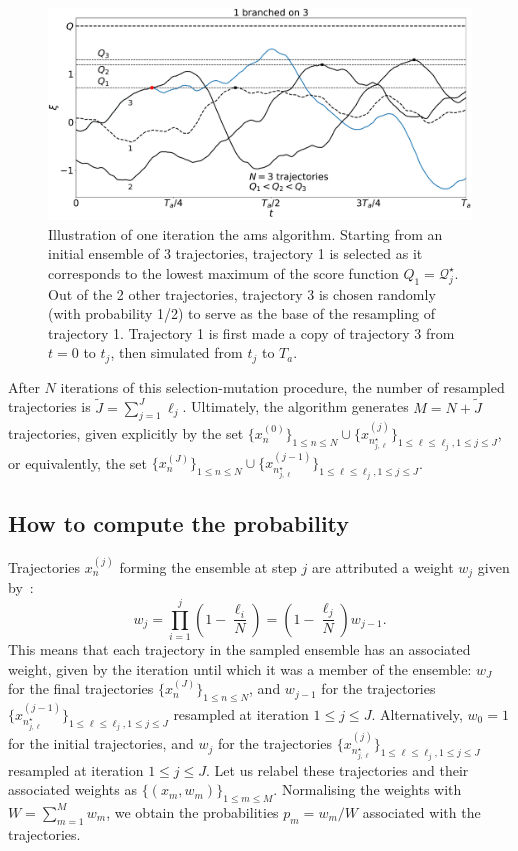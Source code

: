 \documentclass{jfm}
\begin{document}
\begin{figure}
	\centering
	\includegraphics[width=.7\linewidth]{illustr_AMS/illustr_AMS}
	\caption{Illustration of one iteration the \ac{ams} algorithm. Starting from an initial ensemble of 3 trajectories, trajectory 1 is selected as it corresponds to the lowest maximum of the score function $Q_1 = \mathcal{Q}_{j}^\star$. Out of the 2 other trajectories, trajectory 3 is chosen randomly (with probability 1/2) to serve as the base of the resampling of trajectory 1. Trajectory 1 is first made a copy of trajectory 3 from $t=0$ to $t_j$, then simulated from $t_j$ to $T_a$.}
	\label{fig:AMS_schema}
\end{figure}

After $N$ iterations of this selection-mutation procedure, the number of resampled trajectories is
$\tilde{J} = \sum_{j=1}^J \ell_j$.
Ultimately, the algorithm generates $M=N+\tilde{J}$ trajectories, given explicitly by the set $\{x_n^{(0)}\}_{1 \leq n \leq N} \cup \{ x_{n_{j,\ell}^\star}^{(j)}\}_{1 \leq \ell \leq \ell_j, 1 \leq j \leq J}$, or equivalently, the set $\{x_n^{(J)}\}_{1 \leq n \leq N} \cup \{ x_{n_{j,\ell}^\star}^{(j-1)}\}_{1 \leq \ell \leq \ell_j, 1 \leq j \leq J}$.
\subsection{How to compute the probability}
Trajectories $x_n^{(j)}$ forming the ensemble at step $j$ are attributed a weight $w_j$ given by~\cite{Cerou2007,Cerou2011,brehier:hal-01142704}:
\begin{equation}
w_j = \prod_{i=1}^j \left( 1 - \frac{\ell_i}{N}\right)=\left( 1 - \frac{\ell_j}{N}\right)w_{j-1}.
\end{equation}
This means that each trajectory in the sampled ensemble has an associated weight, given by the iteration until which it was a member of the ensemble: $w_J$ for the final trajectories $\{x_n^{(J)}\}_{1 \leq n \leq N}$, and $w_{j-1}$ for the trajectories $\{ x_{n_{j,\ell}^\star}^{(j-1)}\}_{1 \leq \ell \leq \ell_j, 1 \leq j \leq J}$ resampled at iteration $1 \leq j \leq J$.
Alternatively, $w_0 = 1$ for the initial trajectories, and $w_j$ for the trajectories $\{ x_{n_{j,\ell}^\star}^{(j)}\}_{1 \leq \ell \leq \ell_j, 1 \leq j \leq J}$ resampled at iteration $1 \leq j \leq J$.
Let us relabel these trajectories and their associated weights as $\{(x_m,w_m)\}_{1 \leq m \leq M}$.
Normalising the weights with $W=\sum_{m=1}^M w_m$, we obtain the probabilities $p_m=w_m/W$ associated with the trajectories.
\end{document}

